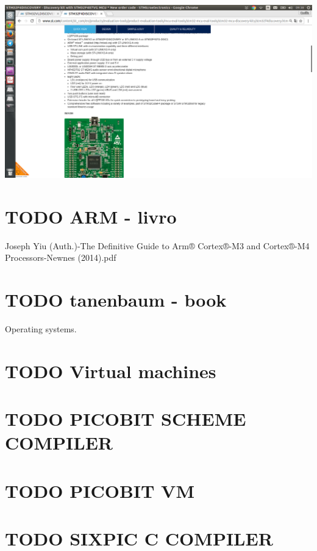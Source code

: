 \documentclass[11pt]{article}
\begin{document}
\includegraphics[width=.9\linewidth]{stm32f4.png}


\section{{\bfseries\sffamily TODO} ARM - livro}
\label{sec-2}

Joseph Yiu (Auth.)-The Definitive Guide to Arm® Cortex®-M3 and Cortex®-M4 Processors-Newnes (2014).pdf

\section{{\bfseries\sffamily TODO} tanenbaum - book}
\label{sec-3}

Operating systems.

\section{{\bfseries\sffamily TODO} Virtual machines}
\label{sec-4}

\section{{\bfseries\sffamily TODO} PICOBIT SCHEME COMPILER}
\label{sec-5}

\section{{\bfseries\sffamily TODO} PICOBIT VM}
\label{sec-6}

\section{{\bfseries\sffamily TODO} SIXPIC C COMPILER}
\label{sec-7}
\end{document}
